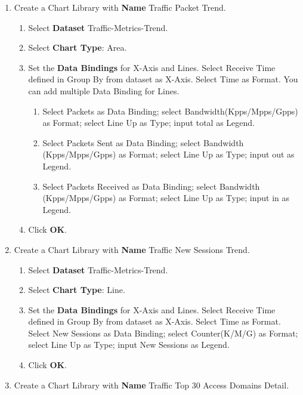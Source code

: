 \begin{description}
\begin{enumerate}
\begin{enumerate}
\begin{enumerate}
            \end{enumerate}
            \item 	 Click \textbf{OK}.
        \end{enumerate}
        \item 	Create a Chart Library with \textbf{Name} Traffic Packet Trend.
        \begin{enumerate}
            \item 	Select \textbf{Dataset} Traffic-Metrics-Trend.
            \item 	Select \textbf{Chart Type}: Area.
            \item 	Set the \textbf{Data Bindings} for X-Axis and Lines. Select Receive Time defined in Group By from dataset as X-Axis. Select Time as Format. You can add multiple Data Binding for Lines.
            \begin{enumerate}
                \item	Select Packets as Data Binding; select Bandwidth(Kpps/Mpps/Gpps) as Format; select Line Up as Type; input total as Legend. 
                \item	Select Packets Sent as Data Binding; select Bandwidth (Kpps/Mpps/Gpps) as Format; select Line Up as Type; input out as Legend.
                \item	Select Packets Received as Data Binding; select Bandwidth (Kpps/Mpps/Gpps) as Format; select Line Up as Type; input in as Legend.
            \end{enumerate}
            \item 	Click \textbf{OK}.
        \end{enumerate}
        \item 	Create a Chart Library with \textbf{Name} Traffic New Sessions Trend.
        \begin{enumerate}
            \item 	Select \textbf{Dataset} Traffic-Metrics-Trend.
            \item 	Select \textbf{Chart Type}: Line.
            \item 	Set the \textbf{Data Bindings} for X-Axis and Lines. Select Receive Time defined in Group By from dataset as X-Axis. Select Time as Format. Select New Sessions as Data Binding; select Counter(K/M/G) as Format; select Line Up as Type; input New Sessions as Legend.
            \item 	Click \textbf{OK}.
        \end{enumerate}
        \item 	Create a Chart Library with \textbf{Name} Traffic Top 30 Access Domains Detail.

\end{enumerate}
\end{description}
